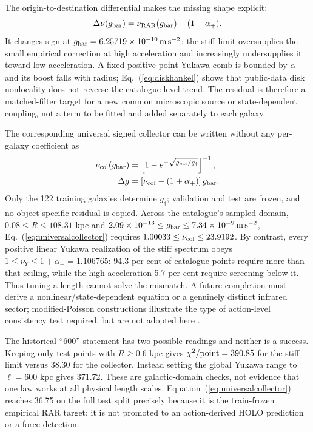 \documentclass[10pt]{article}
\begin{document}
The origin-to-destination differential makes the missing shape explicit:
\begin{equation}
 \Delta\nu(g_{\rm bar})=\nu_{\rm RAR}(g_{\rm bar})-(1+\alpha_+).
 \label{eq:forceresidual}
\end{equation}
It changes sign at $g_{\rm bar}=6.25719\times10^{-10}\,\mathrm{m\,s^{-2}}$:
the stiff limit oversupplies the small empirical correction at high
acceleration and increasingly undersupplies it toward low acceleration.  A
fixed positive point-Yukawa comb is bounded by $\alpha_+$ and its boost falls
with radius; Eq.~(\ref{eq:diskhankel}) shows that public-data disk nonlocality
does not reverse the catalogue-level trend.  The residual is therefore a
matched-filter target for a new common microscopic source or state-dependent
coupling, not a term to be fitted and added separately to each galaxy.

The corresponding universal signed collector can be written without any
per-galaxy coefficient as
\begin{equation}
 \begin{aligned}
 \nu_{\rm col}(g_{\rm bar})&=
 \left[1-e^{-\sqrt{g_{\rm bar}/g_\dagger}}\right]^{-1},\\
 \Delta g&=\left[\nu_{\rm col}-(1+\alpha_+)\right]g_{\rm bar}.
 \end{aligned}
 \label{eq:universalcollector}
\end{equation}
Only the 122 training galaxies determine $g_\dagger$; validation and test are
frozen, and no object-specific residual is copied.  Across the catalogue's
sampled domain, $0.08\leq R\leq108.31$ kpc and
$2.09\times10^{-13}\leq g_{\rm bar}\leq7.34\times10^{-9}\,
\mathrm{m\,s^{-2}}$, Eq.~(\ref{eq:universalcollector}) requires
$1.00033\leq\nu_{\rm col}\leq23.9192$.  By contrast, every positive linear
Yukawa realization of the stiff spectrum obeys
$1\leq\nu_Y\leq1+\alpha_+=1.106765$: 94.3 per cent of catalogue points require
more than that ceiling, while the high-acceleration 5.7 per cent require
screening below it.  Thus tuning a length cannot solve the mismatch.  A future
completion must derive a nonlinear/state-dependent equation or a genuinely
distinct infrared sector; modified-Poisson constructions illustrate the type
of action-level consistency test required, but are not adopted here
\citep{Milgrom2010}.

The historical ``600'' statement has two possible readings and neither is a
success.  Keeping only test points with $R\geq0.6$ kpc gives
$\chi^2/{\rm point}=390.85$ for the stiff limit versus 38.30 for the collector.
Instead setting the global Yukawa range to $\ell=600$ kpc gives 371.72.  These
are galactic-domain checks, not evidence that one law works at all physical
length scales.  Equation~(\ref{eq:universalcollector}) reaches 36.75 on the
full test split precisely because it is the train-frozen empirical RAR target;
it is not promoted to an action-derived HOLO prediction or a force detection.
\end{document}
